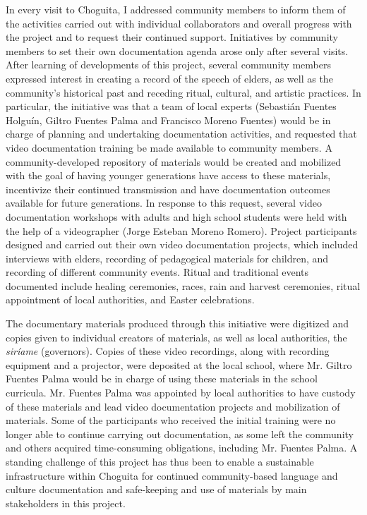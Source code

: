 In every visit to Choguita, I addressed community members to inform them of the activities carried out with individual collaborators and overall progress with the project and to request their continued support. Initiatives by community members to set their own documentation agenda arose only after several visits. After learning of developments of this project, several community members expressed interest in creating a record of the speech of elders, as well as the community’s historical past and receding ritual, cultural, and artistic practices. In particular, the initiative was that a team of local experts (Sebastián Fuentes Holguín, Giltro Fuentes Palma and Francisco Moreno Fuentes) would be in charge of planning and undertaking documentation activities, and requested that video documentation training be made available to community members. A community-developed repository of materials would be created and mobilized with the goal of having younger generations have access to these materials, incentivize their continued transmission and have documentation outcomes available for future generations. In response to this request, several video documentation workshops with adults and high school students were held with the help of a videographer (Jorge Esteban Moreno Romero). Project participants designed and carried out their own video documentation projects, which included interviews with elders, recording of pedagogical materials for children, and recording of different community events. Ritual and traditional events documented include healing ceremonies, races, rain and harvest ceremonies, ritual appointment of local authorities, and Easter celebrations.

The documentary materials produced through this initiative were digitized and copies given to individual creators of materials, as well as local authorities, the \textit{siríame} (governors). Copies of these video recordings, along with recording equipment and a projector, were deposited at the local school, where Mr. Giltro Fuentes Palma would be in charge of using these materials in the school curricula. Mr. Fuentes Palma was appointed by local authorities to have custody of these materials and lead video documentation projects and mobilization of materials. Some of the participants who received the initial training were no longer able to continue carrying out documentation, as some left the community and others acquired time-consuming obligations, including Mr. Fuentes Palma. A standing challenge of this project has thus been to enable a sustainable infrastructure within Choguita for continued community-based language and culture documentation and safe-keeping and use of materials by main stakeholders in this project.

